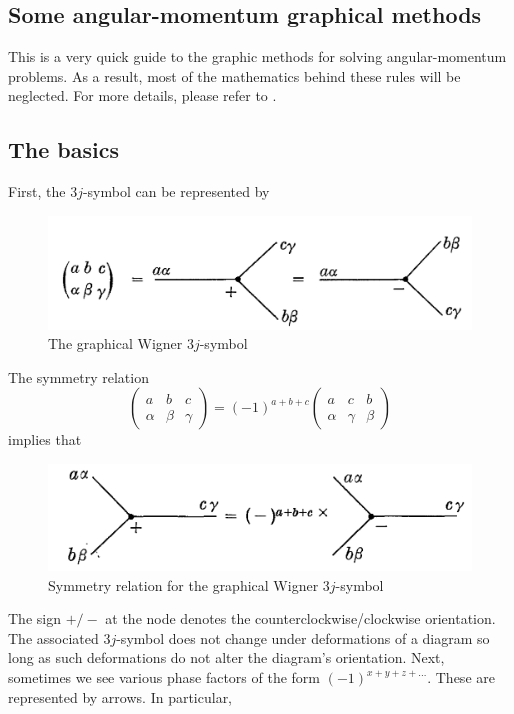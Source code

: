 \documentclass[11pt]{article}
\newcommand{\al}{\alpha}
\newcommand{\be}{\beta}
\newcommand{\tj}[6]{ \begin{pmatrix}
		#1 & #2 & #3 \\
		#4 & #5 & #6 
\end{pmatrix}}
\begin{document}
\begin{appendices}
\section{Some angular-momentum graphical methods \cite{angular_momentum}}\label{app:angular_momentum}


This is a very quick guide to the graphic methods for solving angular-momentum problems. As a result, most of the mathematics behind these rules will be neglected. For more details, please refer to \cite{angular_momentum}.

\subsection{The basics}
First, the $3j$-symbol can be represented by 
\begin{figure}[!htb]
	\centering
	\includegraphics[scale=0.7]{j3_graph}
	\caption{The graphical Wigner $3j$-symbol \cite{angular_momentum}}
\end{figure}
The symmetry relation 
\begin{equation*}
\tj{a}{b}{c}{\al}{\be}{\gamma} = (-1)^{a+b+c}\tj{a}{c}{b}{\al}{\gamma}{\be}
\end{equation*}
implies that 
\begin{figure}[!htb]
	\centering
	\includegraphics[scale=0.7]{j3_graph1}
	\caption{Symmetry relation for the graphical Wigner $3j$-symbol \cite{angular_momentum}}
\end{figure}
The sign $+/-$ at the node denotes the counterclockwise/clockwise orientation. The associated $3j$-symbol does not change under deformations of a diagram so long as such deformations do not alter the diagram's orientation. Next, sometimes we see various phase factors of the form $(-1)^{x+y+z+\dots}$. These are represented by arrows. In particular, 

\end{appendices}
\end{document}
